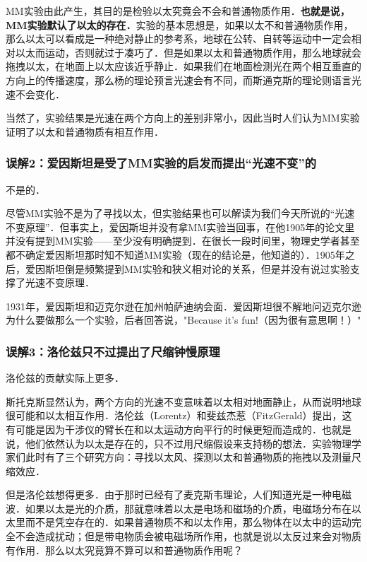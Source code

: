 MM实验由此产生，其目的是检验以太究竟会不会和普通物质作用．\textbf{也就是说，MM实验默认了以太的存在．}实验的基本思想是，如果以太不和普通物质作用，那么以太可以看成是一种绝对静止的参考系，地球在公转、自转等运动中一定会相对以太而运动，否则就过于凑巧了．但是如果以太和普通物质作用，那么地球就会拖拽以太，在地面上以太应该近乎静止．如果我们在地面检测光在两个相互垂直的方向上的传播速度，那么杨的理论预言光速会有不同，而斯通克斯的理论则语言光速不会变化．

当然了，实验结果是光速在两个方向上的差别非常小，因此当时人们认为MM实验证明了以太和普通物质有相互作用．

\subsubsection{误解2：爱因斯坦是受了MM实验的启发而提出“光速不变”的}

不是的．

尽管MM实验不是为了寻找以太，但实验结果也可以解读为我们今天所说的“光速不变原理”．但事实上，爱因斯坦并没有拿MM实验当回事，在他1905年的论文里并没有提到MM实验——至少没有明确提到．在很长一段时间里，物理史学者甚至都不确定爱因斯坦那时知不知道MM实验（现在的结论是，他知道的）．1905年之后，爱因斯坦倒是频繁提到MM实验和狭义相对论的关系，但是并没有说过实验支撑了光速不变原理．

1931年，爱因斯坦和迈克尔逊在加州帕萨迪纳会面．爱因斯坦很不解地问迈克尔逊为什么要做那么一个实验，后者回答说，"Because it's fun!（因为很有意思啊！）" 

\subsubsection{误解3：洛伦兹只不过提出了尺缩钟慢原理}

洛伦兹的贡献实际上更多．

斯托克斯显然认为，两个方向的光速不变意味着以太相对地面静止，从而说明地球很可能和以太相互作用．洛伦兹（Lorentz）和斐兹杰惹（FitzGerald）提出，这有可能是因为干涉仪的臂长在和以太运动方向平行的时候更短而造成的．也就是说，他们依然认为以太是存在的，只不过用尺缩假设来支持杨的想法．实验物理学家们此时有了三个研究方向：寻找以太风、探测以太和普通物质的拖拽以及测量尺缩效应．

但是洛伦兹想得更多．由于那时已经有了麦克斯韦理论，人们知道光是一种电磁波．如果以太是光的介质，那就意味着以太是电场和磁场的介质，电磁场分布在以太里而不是凭空存在的．如果普通物质不和以太作用，那么物体在以太中的运动完全不会造成扰动；但是带电物质会被电磁场所作用，也就是说以太反过来会对物质有作用．那么以太究竟算不算可以和普通物质作用呢？

